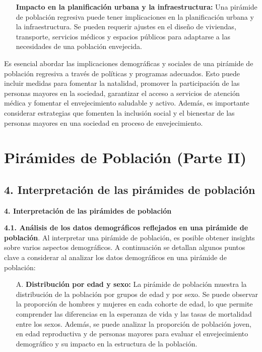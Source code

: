 \documentclass[8pt,a4paper]{beamer}
\begin{document}
{\begin{frame}{}
\begin{block}{}
\begin{enumerate}
\begin{enumerate}
\begin{itemize}
\item[\ding{65}] \textbf{Impacto en la planificación urbana y la infraestructura:} Una pirámide de población regresiva puede tener implicaciones en la planificación urbana y la infraestructura. Se pueden requerir ajustes en el diseño de viviendas, transporte, servicios médicos y espacios públicos para adaptarse a las necesidades de una población envejecida.
\end{itemize}
\end{enumerate}
Es esencial abordar las implicaciones demográficas y sociales de una pirámide de población regresiva a través de políticas y programas adecuados. Esto puede incluir medidas para fomentar la natalidad, promover la participación de las personas mayores en la sociedad, garantizar el acceso a servicios de atención médica y fomentar el envejecimiento saludable y activo. Además, es importante considerar estrategias que fomenten la inclusión social y el bienestar de las personas mayores en una sociedad en proceso de envejecimiento.
\end{enumerate}
\end{block}
\end{frame}

\section{Pirámides de Población (Parte II)}
\subsection{4. Interpretación de las pirámides de población}
\begin{frame}{\textbf{4. Interpretación de las pirámides de población}}
\justifying
\begin{block}{\textbf{4.1. Análisis de los datos demográficos reflejados en una pirámide de población}.}
\justifying
 Al interpretar una pirámide de población, es posible obtener insights sobre varios aspectos demográficos. A continuación se detallan algunos puntos clave a considerar al analizar los datos demográficos en una pirámide de población:
\begin{enumerate}
\justifying
\item[A.] \textbf{Distribución por edad y sexo:} La pirámide de población muestra la distribución de la población por grupos de edad y por sexo. Se puede observar la proporción de hombres y mujeres en cada cohorte de edad, lo que permite comprender las diferencias en la esperanza de vida y las tasas de mortalidad entre los sexos. Además, se puede analizar la proporción de población joven, en edad reproductiva y de personas mayores para evaluar el envejecimiento demográfico y su impacto en la estructura de la población.


\end{enumerate}
\end{block}
\end{frame}}
\end{document}
